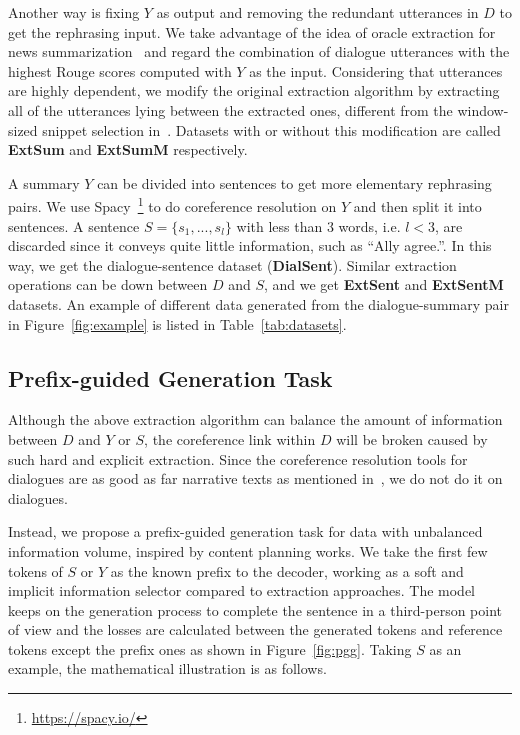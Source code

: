 Another way is fixing $Y$ as output and removing the redundant utterances in $D$ to get the rephrasing input. We take advantage of the idea of oracle extraction for news summarization~\cite{zhou-etal-2018-neural-document} and regard the combination of dialogue utterances with the highest Rouge scores computed with $Y$ as the input. Considering that utterances are highly dependent, we modify the original extraction algorithm by extracting all of the utterances lying between the extracted ones, different from the window-sized snippet selection in~\cite{liu-etal-2021-topic-aware}.  Datasets with or without this modification are called \textbf{ExtSum} and \textbf{ExtSumM} respectively.

A summary $Y$ can be divided into sentences to get more elementary rephrasing pairs. We use Spacy~\footnote{\url{https://spacy.io/}} to do coreference resolution on $Y$ and then split it into sentences. A sentence $S = \{s_1, ..., s_l\}$ with less than $3$ words, i.e. $l<3$, are discarded since it conveys quite little information, such as ``Ally agree.''. In this way, we get the dialogue-sentence dataset (\textbf{DialSent}). Similar extraction operations can be down between $D$ and $S$, and we get \textbf{ExtSent} and \textbf{ExtSentM} datasets.
An example of different data generated from the dialogue-summary pair in Figure~\ref{fig:example} is listed in Table~\ref{tab:datasets}.





\subsection{Prefix-guided Generation Task}
Although the above extraction algorithm can balance the amount of information between $D$ and $Y$ or $S$, the coreference link within $D$ will be broken caused by such hard and explicit extraction. Since the coreference resolution tools for dialogues are as good as far narrative texts as mentioned in~\citet{liu2021coreference}, we do not do it on dialogues. 

Instead, we propose a prefix-guided generation task for data with unbalanced information volume, inspired by content planning works\cite{narayan2021planning,wu-etal-2021-controllable}. 
We take the first few tokens of $S$ or $Y$ as the known prefix to the decoder, working as a soft and implicit information selector compared to extraction approaches.
The model keeps on the generation process to complete the sentence in a third-person point of view and the losses are calculated between the generated tokens and reference tokens except the prefix ones as shown in Figure~\ref{fig:pgg}. 
Taking $S$ as an example, the mathematical illustration is as follows.


